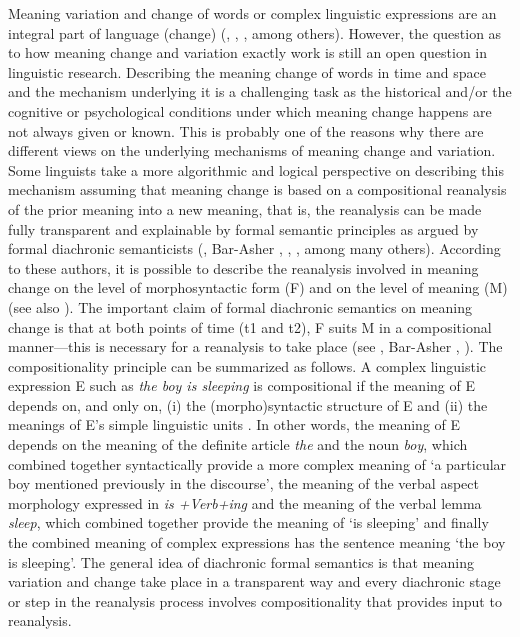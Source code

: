 Meaning variation and change of words or complex linguistic expressions are an integral part of language (change) (\citealt{Blank1997}, \citealt{Traugott1989}, \citealt{Eckardt2006}, among others). However, the question as to how meaning change and variation exactly work is still an open question in linguistic research. Describing the meaning change of words in time and space and the mechanism underlying it is a challenging task as the historical and/or the cognitive or psychological conditions under which meaning change happens are not always given or known. This is probably one of the reasons why there are different views on the underlying mechanisms of meaning change and variation. Some linguists take a more algorithmic and logical perspective on describing this mechanism assuming that meaning change is based on a compositional reanalysis of the prior meaning into a new meaning, that is, the reanalysis can be made fully transparent and explainable by formal semantic principles as argued by formal diachronic semanticists (\citealt{Eckardt2006}, Bar-Asher \citealt{Siegal2015}, \citealt{Condoravdi2015}, \citealt{Aloni2021}, among many others). According to these authors, it is possible to describe the reanalysis involved in meaning change on the level of morphosyntactic form (F) and on the level of meaning (M) (see also \citealt{DetgersEtAl2021}). The important claim of formal diachronic semantics on meaning change is that at both points of time (t1 and t2), F suits M in a compositional manner—this is necessary for a reanalysis to take place (see \citealt{Eckardt2006}, Bar-Asher \citealt{Siegal2015}, \citealt{Aloni2021}). The compositionality principle can be summarized as follows. A complex linguistic expression E such as \textit{the boy is sleeping} is compositional if the meaning of E depends on, and only on, (i) the (morpho)syntactic structure of E and (ii) the meanings of E’s simple linguistic units \citep{Frege1997}. In other words, the meaning of E depends on the meaning of the definite article \textit{the} and the noun \textit{boy}, which combined together syntactically provide a more complex meaning of ‘a particular boy mentioned previously in the discourse’, the meaning of the verbal aspect morphology expressed in \textit{is +Verb+ing} and the meaning of the verbal lemma \textit{sleep}, which combined together provide the meaning of ‘is sleeping’ and finally the combined meaning of complex expressions has the sentence meaning ‘the boy is sleeping’. The general idea of diachronic formal semantics is that meaning variation and change take place in a transparent way and every diachronic stage or step in the reanalysis process involves compositionality that provides input to reanalysis.

